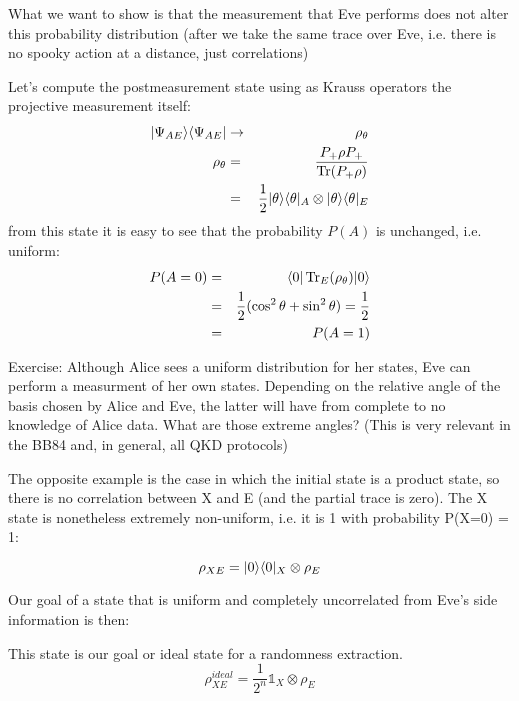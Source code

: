\begin{example}
	What we want to show is that the measurement that Eve performs does not alter this probability distribution (after we take the same trace over Eve, i.e. there is no spooky action at a distance, just correlations)

	Let's compute the postmeasurement state using as Krauss operators the projective measurement itself:
	\begin{eqnarray}
		\lvert\Psi_{AE}\rangle\langle\Psi_{AE}\rvert &\rightarrow&  \rho_\theta \\
		\rho_\theta &=& \displaystyle\frac{P_+\rho P_+}{\operatorname{Tr} (P_+\rho)} \\
		&=& \frac{1}{2} \lvert\theta\rangle \langle\theta\rvert_A \otimes \lvert\theta\rangle \langle\theta\rvert_E
	\end{eqnarray}
	from this state it is easy to see that the probability $P(A)$ is unchanged, i.e. uniform:
	\begin{eqnarray}
		P(A = 0) &=& \langle0\rvert\operatorname{Tr}_E(\rho_\theta)\lvert0\rangle \\
		&=& \frac{1}{2} (\cos^2{\theta} + \sin^2{\theta}) = \frac{1}{2}\\
		&=& P(A = 1)
	\end{eqnarray}

	Exercise: Although Alice sees a uniform distribution for her states, Eve can perform a measurment of her own states. Depending on the relative angle of the basis chosen by Alice and Eve, the latter will have from complete to no knowledge of Alice data. What are those extreme angles? (This is very relevant in the BB84 and, in general, all QKD protocols)
\end{example}

\begin{example}
	The opposite example is the case in which the initial state is a product state, so there is no correlation between X and E (and the partial trace is zero). The X state is nonetheless extremely non-uniform, i.e. it is 1 with probability P(X=0) = 1:

	\begin{equation}
		\rho_{XE} = \lvert0\rangle\langle0\rvert_X \otimes \rho_E
	\end{equation}
\end{example}

Our goal of a state that is uniform and completely uncorrelated from Eve's side information is then:

 \label{eq:PAgoalstate}
This state is our goal or ideal state for a randomness extraction.
\begin{equation}
	\rho^{ideal}_{XE} = \frac{1}{2^n}\mathbb{1}_X \otimes \rho_E
\end{equation}

